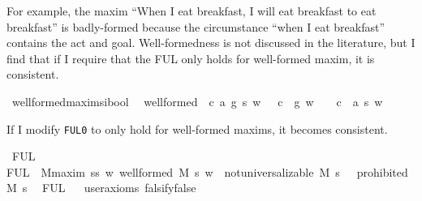 \begin{isabellebody}
\begin{isamarkuptext}
For example, the maxim ``When I eat breakfast, I will eat breakfast to eat breakfast'' is badly-formed
because the circumstance ``when I eat breakfast'' contains the act and goal. Well-formedness is not 
discussed in the literature, but I find that if I require that the FUL only holds for well-formed maxim, it is
consistent.%
\end{isamarkuptext}\isamarkuptrue%
\isamarkupfalse%
\ well{\isacharunderscore}formed{\isacharcolon}{\isacharcolon}{\isachardoublequoteopen}maxim{\isasymRightarrow}s{\isasymRightarrow}i{\isasymRightarrow}bool{\isachardoublequoteclose}\ \ \isanewline
{\isachardoublequoteopen}well{\isacharunderscore}formed\ {\isasymequiv}\ {\isasymlambda}{\isacharparenleft}c{\isacharcomma}\ a{\isacharcomma}\ g{\isacharparenright}{\isachardot}\ {\isasymlambda}s{\isachardot}\ {\isasymlambda}w{\isachardot}\ {\isacharparenleft}{\isasymnot}\ \ {\isacharparenleft}c\ \isactrlbold {\isasymrightarrow}\ g{\isacharparenright}\ w{\isacharparenright}\ {\isasymand}\ {\isacharparenleft}{\isasymnot}\ \ {\isacharparenleft}c\ \isactrlbold {\isasymrightarrow}\ a\ s{\isacharparenright}\ w{\isacharparenright}{\isachardoublequoteclose}\isanewline
%
%
\begin{isamarkuptext}%
\noindent If I modify \texttt{FUL0} to only hold for well-formed maxims, it becomes consistent.%
\end{isamarkuptext}\isamarkuptrue%
\isamarkupfalse%
\ FUL\ \ \isanewline
{\isachardoublequoteopen}FUL\ {\isasymequiv}\ {\isasymforall}M{\isacharcolon}{\isacharcolon}maxim{\isachardot}\ {\isasymforall}s{\isacharcolon}{\isacharcolon}s{\isachardot}\ {\isacharparenleft}{\isasymforall}w{\isachardot}\ well{\isacharunderscore}formed\ M\ s\ w{\isacharparenright}\ {\isasymlongrightarrow}\ {\isacharparenleft}not{\isacharunderscore}universalizable\ M\ s\ {\isasymlongrightarrow}\ {\isasymTurnstile}\ {\isacharparenleft}prohibited\ M\ s{\isacharparenright}\ {\isacharparenright}{\isachardoublequoteclose}\isanewline
%
\isanewline
\isanewline
{}\isamarkupfalse%
\ {\isachardoublequoteopen}FUL{\isachardoublequoteclose}\isanewline
\ \ \isamarkupfalse%
{\isacharbrackleft}user{\isacharunderscore}axioms{\isacharcomma}\ falsify{\isacharequal}false{\isacharbrackright}%
\isadelimproof
\ %
\endisadelimproof
%
\isatagproof
{}\isamarkupfalse%
\isanewline
%
\end{isabellebody}
